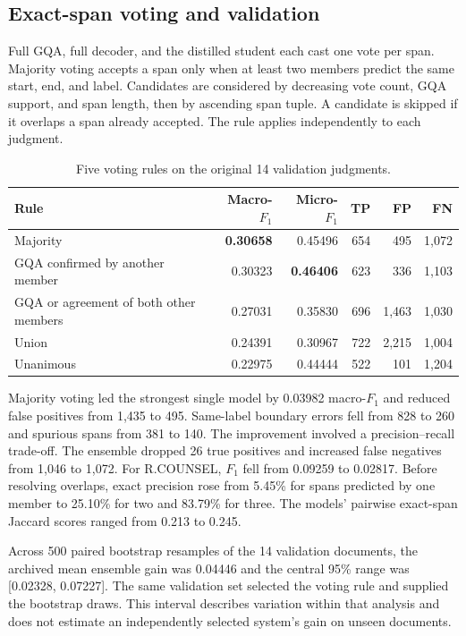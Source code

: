 \documentclass[11pt,a4paper]{article}
\begin{document}
\subsection{Exact-span voting and validation}
Full GQA, full decoder, and the distilled student each cast one vote per span. Majority voting accepts a span only when at least two members predict the same start, end, and label. Candidates are considered by decreasing vote count, GQA support, and span length, then by ascending span tuple. A candidate is skipped if it overlaps a span already accepted. The rule applies independently to each judgment.

\begin{table}[htbp]\centering\small
\caption{Five voting rules on the original 14 validation judgments.}
\label{tab:p2-votes}
\begin{tabular}{lrrrrr}
\toprule
Rule & Macro-\(F_1\) & Micro-\(F_1\) & TP & FP & FN \\
\midrule
Majority & \textbf{0.30658} & 0.45496 & 654 & 495 & 1,072 \\
GQA confirmed by another member & 0.30323 & \textbf{0.46406} & 623 & 336 & 1,103 \\
GQA or agreement of both other members & 0.27031 & 0.35830 & 696 & 1,463 & 1,030 \\
Union & 0.24391 & 0.30967 & 722 & 2,215 & 1,004 \\
Unanimous & 0.22975 & 0.44444 & 522 & 101 & 1,204 \\
\bottomrule
\end{tabular}
\end{table}

Majority voting led the strongest single model by 0.03982 macro-\(F_1\) and reduced false positives from 1,435 to 495. Same-label boundary errors fell from 828 to 260 and spurious spans from 381 to 140. The improvement involved a precision--recall trade-off. The ensemble dropped 26 true positives and increased false negatives from 1,046 to 1,072. For R.COUNSEL, \(F_1\) fell from 0.09259 to 0.02817. Before resolving overlaps, exact precision rose from 5.45\% for spans predicted by one member to 25.10\% for two and 83.79\% for three. The models' pairwise exact-span Jaccard scores ranged from 0.213 to 0.245.

Across 500 paired bootstrap resamples of the 14 validation documents, the archived mean ensemble gain was 0.04446 and the central 95\% range was [0.02328, 0.07227]. The same validation set selected the voting rule and supplied the bootstrap draws. This interval describes variation within that analysis and does not estimate an independently selected system's gain on unseen documents.
\end{document}
